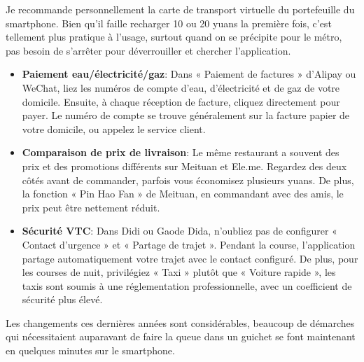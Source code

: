 Je recommande personnellement la carte de transport virtuelle du portefeuille du smartphone. Bien qu'il faille recharger 10 ou 20 yuans la première fois, c'est tellement plus pratique à l'usage, surtout quand on se précipite pour le métro, pas besoin de s'arrêter pour déverrouiller et chercher l'application.


\begin{itemize}
  \item \textbf{Paiement eau/électricité/gaz}: Dans « Paiement de factures » d'Alipay ou WeChat, liez les numéros de compte d'eau, d'électricité et de gaz de votre domicile. Ensuite, à chaque réception de facture, cliquez directement pour payer. Le numéro de compte se trouve généralement sur la facture papier de votre domicile, ou appelez le service client.
  \item \textbf{Comparaison de prix de livraison}: Le même restaurant a souvent des prix et des promotions différents sur Meituan et Ele.me. Regardez des deux côtés avant de commander, parfois vous économisez plusieurs yuans. De plus, la fonction « Pin Hao Fan » de Meituan, en commandant avec des amis, le prix peut être nettement réduit.
  \item \textbf{Sécurité VTC}: Dans Didi ou Gaode Dida, n'oubliez pas de configurer « Contact d'urgence » et « Partage de trajet ». Pendant la course, l'application partage automatiquement votre trajet avec le contact configuré. De plus, pour les courses de nuit, privilégiez « Taxi » plutôt que « Voiture rapide », les taxis sont soumis à une réglementation professionnelle, avec un coefficient de sécurité plus élevé.
\end{itemize}


Les changements ces dernières années sont considérables, beaucoup de démarches qui nécessitaient auparavant de faire la queue dans un guichet se font maintenant en quelques minutes sur le smartphone.

